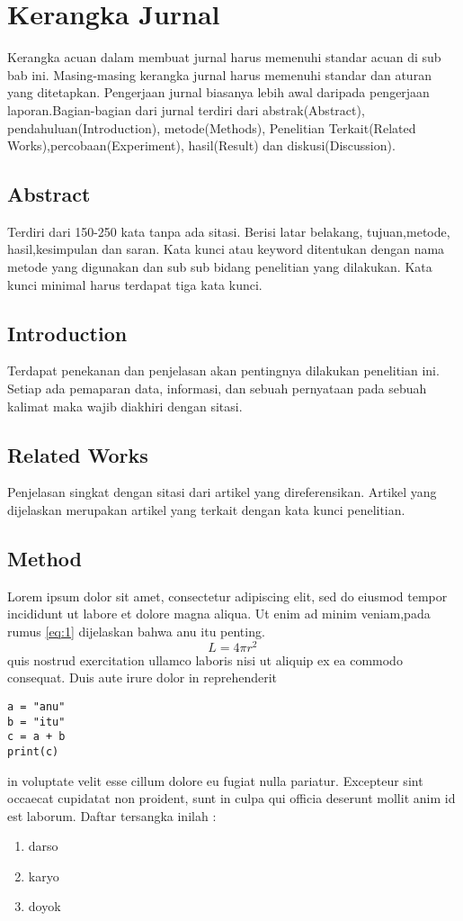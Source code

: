 \section{Kerangka Jurnal}
Kerangka acuan dalam membuat jurnal harus memenuhi standar acuan di sub bab ini. Masing-masing kerangka jurnal harus memenuhi standar dan aturan yang ditetapkan. Pengerjaan jurnal biasanya lebih awal daripada pengerjaan laporan.Bagian-bagian dari jurnal terdiri dari abstrak(Abstract), pendahuluan(Introduction), metode(Methods), Penelitian Terkait(Related Works),percobaan(Experiment), hasil(Result) dan diskusi(Discussion).
\subsection{Abstract}
Terdiri dari 150-250 kata tanpa ada sitasi. Berisi latar belakang, tujuan,metode, hasil,kesimpulan dan saran. Kata kunci atau keyword ditentukan dengan nama metode yang digunakan dan sub sub bidang penelitian yang dilakukan. Kata kunci minimal harus terdapat tiga kata kunci.

\subsection{Introduction}
Terdapat penekanan dan penjelasan akan pentingnya dilakukan penelitian ini. Setiap ada pemaparan data, informasi, dan sebuah pernyataan pada sebuah kalimat maka wajib diakhiri dengan sitasi.

\subsection{Related Works}
Penjelasan singkat dengan sitasi dari artikel yang direferensikan. Artikel yang dijelaskan merupakan artikel yang terkait dengan kata kunci penelitian.

\subsection{Method}

Lorem ipsum dolor sit amet, consectetur adipiscing elit, sed do eiusmod tempor incididunt ut labore et dolore magna aliqua. Ut enim ad minim veniam,pada rumus \ref{eq:1} dijelaskan bahwa anu itu penting.
\begin{equation}\label{eq:1}
     L = 4 \pi r^2 \,
\end{equation}
quis nostrud exercitation ullamco laboris nisi ut aliquip ex ea commodo consequat. Duis aute irure dolor in reprehenderit 
\begin{verbatim}
a = "anu"
b = "itu"
c = a + b
print(c) 
\end{verbatim}
in voluptate velit esse cillum dolore eu fugiat nulla pariatur. Excepteur sint occaecat cupidatat non proident, sunt in culpa qui officia deserunt mollit anim id est laborum. Daftar tersangka inilah :
\begin{enumerate}
\item darso
\item karyo
\item doyok
\end{enumerate}